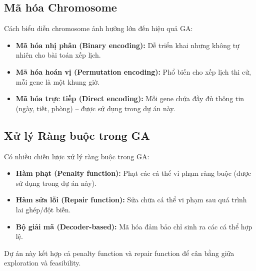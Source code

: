 \subsection{Mã hóa Chromosome}
Cách biểu diễn chromosome ảnh hưởng lớn đến hiệu quả GA:
\begin{itemize}
    \item \textbf{Mã hóa nhị phân (Binary encoding):} Dễ triển khai nhưng không tự nhiên cho bài toán xếp lịch.
    \item \textbf{Mã hóa hoán vị (Permutation encoding):} Phổ biến cho xếp lịch thi cử, mỗi gene là một khung giờ.
    \item \textbf{Mã hóa trực tiếp (Direct encoding):} Mỗi gene chứa đầy đủ thông tin (ngày, tiết, phòng) -- được sử dụng trong dự án này.
\end{itemize}

\subsection{Xử lý Ràng buộc trong GA}
Có nhiều chiến lược xử lý ràng buộc trong GA:
\begin{itemize}
    \item \textbf{Hàm phạt (Penalty function):} Phạt các cá thể vi phạm ràng buộc (được sử dụng trong dự án này).
    \item \textbf{Hàm sửa lỗi (Repair function):} Sửa chữa cá thể vi phạm sau quá trình lai ghép/đột biến.
    \item \textbf{Bộ giải mã (Decoder-based):} Mã hóa đảm bảo chỉ sinh ra các cá thể hợp lệ.
\end{itemize}

Dự án này kết hợp cả penalty function và repair function để cân bằng giữa exploration và feasibility.
